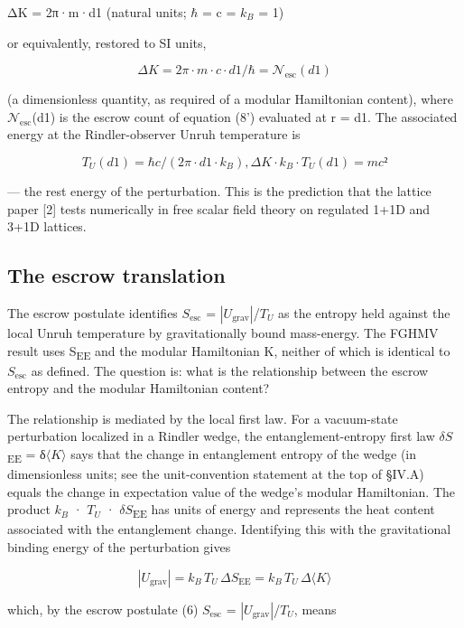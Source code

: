 \documentclass[11pt]{article}
\begin{document}
ΔK = 2π·m·d1 (natural units; $\hbar$ = c = $k_{B}$ = 1)

or equivalently, restored to SI units,

\[ ΔK = 2π\cdot m\cdot c\cdot d1/ℏ = 𝒩_{\mathrm{esc}}(d1) \]

(a dimensionless quantity, as required of a modular Hamiltonian
content), where $\mathcal{N}_{\mathrm{esc}}$(d1) is the escrow count of equation (8')
evaluated at r = d1. The associated energy at the Rindler-observer Unruh
temperature is

\[ T_U(d1) = ℏc/(2π\cdot d1\cdot k_B), ΔK\cdot k_B\cdot T_U(d1) = mc² \]

--- the rest energy of the perturbation. This is the prediction that the
lattice paper [2] tests numerically in free scalar field theory on
regulated 1+1D and 3+1D lattices.


\subsection{The escrow translation}

The escrow postulate identifies $S_{\mathrm{esc}}$ = $|U_{\mathrm{grav}}|$/$T_{U}$ as the entropy
held against the local Unruh temperature by gravitationally bound
mass-energy. The FGHMV result uses S\textsubscript{EE} and the modular Hamiltonian K,
neither of which is identical to $S_{\mathrm{esc}}$ as defined. The question is: what
is the relationship between the escrow entropy and the modular
Hamiltonian content?

The relationship is mediated by the local first law. For a vacuum-state
perturbation localized in a Rindler wedge, the entanglement-entropy
first law $\delta S$\textsubscript{EE} = δ$\langle K\rangle$ says that the change in entanglement entropy of
the wedge (in dimensionless units; see the unit-convention statement at
the top of §IV.A) equals the change in expectation value of the wedge's
modular Hamiltonian. The product $k_{B}$ · $T_{U}$ · $\delta S$\textsubscript{EE} has units of energy
and represents the heat content associated with the entanglement change.
Identifying this with the gravitational binding energy of the
perturbation gives

\begin{equation}
  |U_{\mathrm{grav}}| = k_{B}\, T_{U}\, \Delta S_{\mathrm{EE}} = k_{B}\, T_{U}\, \Delta\langle K\rangle
  \label{eq:19}
\end{equation}

which, by the escrow postulate (6) $S_{\mathrm{esc}}$ = $|U_{\mathrm{grav}}|$/$T_{U}$, means
\end{document}
